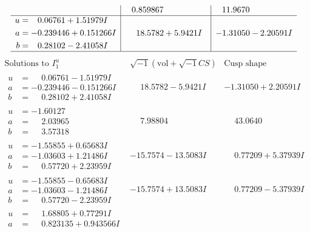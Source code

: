 \documentclass[1p]{elsarticle_modified}
\theoremstyle{definition}
\newcommand{\I}{\sqrt{-1}}
\begin{document}
$$\begin{array}{c|c|c}
 & \phantom{-}0.859867\phantom{ +0.000000I} & \phantom{-}11.9670\phantom{ +0.000000I} \\ \hline\begin{aligned}
u &= \phantom{-}0.06761 + 1.51979 I \\
a &= -0.239446 + 0.151266 I \\
b &= \phantom{-}0.28102 - 2.41058 I\end{aligned}
 & \phantom{-}18.5782 + 5.9421 I & -1.31050 - 2.20591 I\\
 \hline 
 \end{array}$$\newpage$$\begin{array}{c|c|c}  
\text{Solutions to }I^u_{1}& \I (\text{vol} + \sqrt{-1}CS) & \text{Cusp shape}\\
 \hline 
\begin{aligned}
u &= \phantom{-}0.06761 - 1.51979 I \\
a &= -0.239446 - 0.151266 I \\
b &= \phantom{-}0.28102 + 2.41058 I\end{aligned}
 & \phantom{-}18.5782 - 5.9421 I & -1.31050 + 2.20591 I \\ \hline\begin{aligned}
u &= -1.60127\phantom{ +0.000000I} \\
a &= \phantom{-}2.03965\phantom{ +0.000000I} \\
b &= \phantom{-}3.57318\phantom{ +0.000000I}\end{aligned}
 & \phantom{-}7.98804\phantom{ +0.000000I} & \phantom{-}43.0640\phantom{ +0.000000I} \\ \hline\begin{aligned}
u &= -1.55855 + 0.65683 I \\
a &= -1.03603 + 1.21486 I \\
b &= \phantom{-}0.57720 + 2.23959 I\end{aligned}
 & -15.7574 - 13.5083 I & \phantom{-}0.77209 + 5.37939 I \\ \hline\begin{aligned}
u &= -1.55855 - 0.65683 I \\
a &= -1.03603 - 1.21486 I \\
b &= \phantom{-}0.57720 - 2.23959 I\end{aligned}
 & -15.7574 + 13.5083 I & \phantom{-}0.77209 - 5.37939 I \\ \hline\begin{aligned}
u &= \phantom{-}1.68805 + 0.77291 I \\
a &= \phantom{-}0.823135 + 0.943566 I \\

\end{aligned}
\end{array}$$
\end{document}
